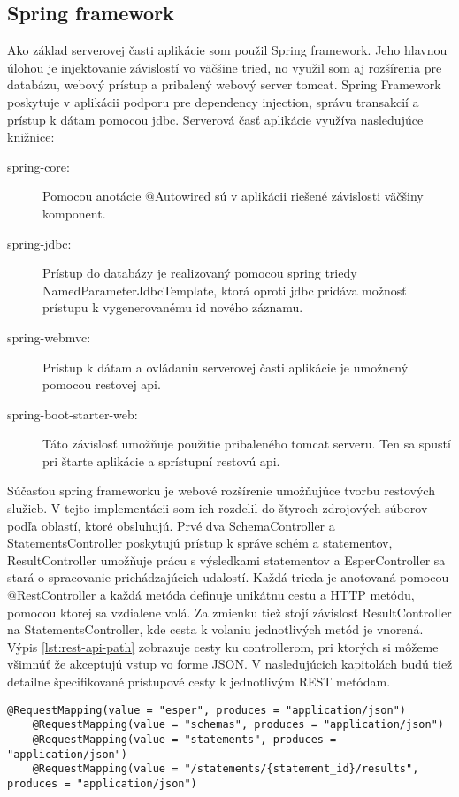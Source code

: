 	\subsection{Spring framework}
		Ako základ serverovej časti aplikácie som použil Spring framework. Jeho hlavnou úlohou je injektovanie závislostí vo väčšine tried, no využil som aj rozšírenia pre databázu, webový prístup a pribalený webový server tomcat.
		Spring Framework poskytuje v aplikácii podporu pre dependency injection, správu transakcií a prístup k dátam pomocou jdbc. Serverová časť aplikácie využíva nasledujúce knižnice:
		\begin{description}
			\item[spring-core:] Pomocou anotácie @Autowired sú v aplikácii riešené závislosti väčšiny komponent.
			\item[spring-jdbc:] Prístup do databázy je realizovaný pomocou spring triedy NamedParameterJdbcTemplate, ktorá oproti jdbc pridáva možnosť prístupu k vygenerovanému id nového záznamu.
			\item[spring-webmvc:] Prístup k dátam a ovládaniu serverovej časti aplikácie je umožnený pomocou restovej api.
			\item[spring-boot-starter-web:] Táto závislosť umožňuje použitie pribaleného tomcat serveru. Ten sa spustí pri štarte aplikácie a sprístupní restovú api.
		\end{description}
		
		Súčasťou spring frameworku je webové rozšírenie umožňujúce tvorbu restových služieb. V tejto implementácii som ich rozdelil do štyroch zdrojových súborov podľa oblastí, ktoré obsluhujú. Prvé dva SchemaController a StatementsController poskytujú prístup k správe schém a statementov, ResultController umožňuje prácu s výsledkami statementov a EsperController sa stará o spracovanie prichádzajúcich udalostí. Každá trieda je anotovaná pomocou @RestController a každá metóda definuje unikátnu cestu a HTTP metódu, pomocou ktorej sa vzdialene volá. Za zmienku tiež stojí závislosť ResultController na StatementsController, kde cesta k volaniu jednotlivých metód je vnorená. Výpis \ref{lst:rest-api-path} zobrazuje cesty ku controllerom, pri ktorých si môžeme všimnúť že akceptujú vstup vo forme JSON. V nasledujúcich kapitolách budú tiež detailne špecifikované prístupové cesty k jednotlivým REST metódam.
		
		\begin{lstlisting}[label=lst:rest-api-path,caption=Definícia ciest REST API]
	@RequestMapping(value = "esper", produces = "application/json")
	@RequestMapping(value = "schemas", produces = "application/json")
	@RequestMapping(value = "statements", produces = "application/json")
	@RequestMapping(value = "/statements/{statement_id}/results", produces = "application/json")
		\end{lstlisting}
		
